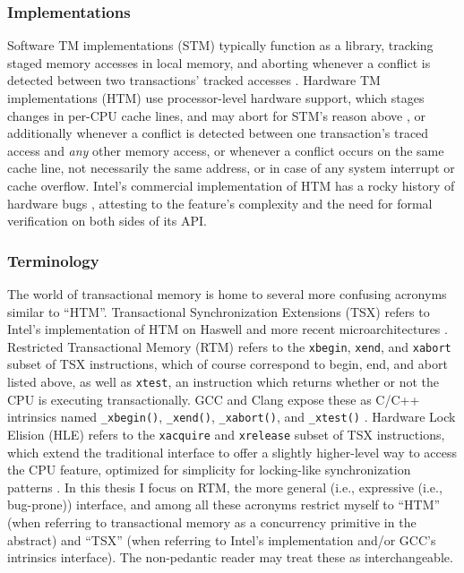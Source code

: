 \subsubsection{Implementations}

Software TM implementations (STM) typically function as a library,
tracking staged memory accesses in local memory,
and aborting whenever a conflict is detected between two transactions' tracked accesses \cite{stm-pldi06,mcrt-stm,swisstm}.
Hardware TM implementations (HTM) use processor-level hardware support,
which stages changes in per-CPU cache lines,
and may abort for STM's reason above \cite{intel-tsx-overview},
or additionally whenever a conflict is detected between one transaction's traced access and {\em any} other memory access,
or whenever a conflict occurs on the same cache line, not necessarily the same address,
or in case of any system interrupt or cache overflow.
Intel's commercial implementation of HTM has a rocky history of hardware bugs \cite{intel-disable-tsx,intel-tsx-update},
attesting to the feature's complexity and the need for formal verification on both sides of its API.

\subsubsection{Terminology}

The world of transactional memory is home to several more confusing acronyms similar to ``HTM''.
Transactional Synchronization Extensions (TSX)
refers to Intel's implementation of HTM on Haswell and more recent microarchitectures
\cite{htm-haswell}.
Restricted Transactional Memory (RTM)
refers to the {\tt xbegin}, {\tt xend}, and {\tt xabort} subset of TSX instructions,
which of course correspond to {\sf begin}, {\sf end}, and {\sf abort} listed above,
as well as {\tt xtest}, an instruction which returns whether or not the CPU is executing transactionally.
GCC and Clang expose these as C/C++ intrinsics named {\tt \_xbegin()}, {\tt \_xend()}, {\tt \_xabort()}, and {\tt \_xtest()}
\cite{htm-gcc}.
Hardware Lock Elision (HLE)
refers to the {\tt xacquire} and {\tt xrelease} subset of TSX instructions,
which extend the traditional interface to offer a slightly higher-level way to access the CPU feature,
optimized for simplicity for locking-like synchronization patterns
\cite{speculative-lock-elision,lock-elision}.
In this thesis I focus on RTM, the more general (i.e., expressive (i.e., bug-prone)) interface,
and among all these acronyms restrict myself to ``HTM''
(when referring to transactional memory as a concurrency primitive in the abstract)
and ``TSX''
(when referring to Intel's implementation and/or GCC's intrinsics interface).
The non-pedantic reader may treat these as interchangeable.

